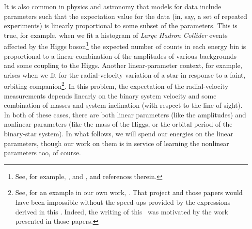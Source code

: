 It is also common in physics and astronomy that models for data
include parameters such that the expectation value for the data (in,
say, a set of repeated experiments) is linearly proportional to some
subset of the parameters.
This is true, for example, when we fit a histogram of \textsl{Large Hadron
  Collider} events affected by the Higgs boson\footnote{See, for example,
  \cite{atlas}, and \cite{cms}, and references therein.}
the expected number of counts in each
energy bin is proportional to a linear combination of the amplitudes
of various backgrounds and some coupling to the Higgs.
Another linear-parameter context, for example, arises when we fit for the radial-velocity
variation of a star in response to a faint, orbiting companion\footnote{See,
  for an example in our own work, \cite{Price-Whelan:2017, Price-Whelan:2020}.
  That project and those papers would have been
  impossible without the speed-ups provided by the expressions derived in this
  \documentname. Indeed, the writing of this \documentname\ was motivated by
  the work presented in those papers.}.
In this problem, the expectation of the
radial-velocity measurements depends linearly on the binary system
velocity and some combination of masses and system inclination (with
respect to the line of sight).
In both of these cases, there are both linear parameters (like the
amplitudes) and nonlinear parameters (like the mass of the Higgs, or
the orbital period of the binary-star system).
In what follows, we will spend our energies on the linear parameters,
though our work on them is in service of learning the nonlinear
parameters too, of course.

